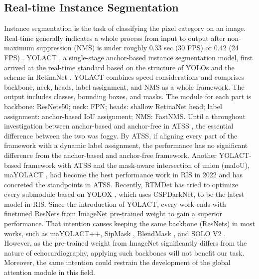 \documentclass{article}
\begin{document}
\subsection{Real-time Instance Segmentation}
\label{sec2.2}
Instance segmentation is the task of classifying the pixel category on an image. Real-time generally indicates a whole process from input to output after non-maximum suppression (NMS) is under roughly 0.33 sec (30 FPS) \cite{bolya2019yolact} or 0.42 (24 FPS) \cite{oksuz2021mask}. YOLACT \cite{bolya2019yolact}, a single-stage anchor-based instance segmentation model, first arrived at the real-time standard based on the structure of YOLOs \cite{redmon2018yolov3}\cite{ge2021yolox} and the scheme in RetinaNet \cite{lin2017focal}. YOLACT combines speed considerations and comprises backbone, neck, heads, label assignment, and NMS as a whole framework. The output includes classes, bounding boxes, and masks. The module for each part is backbone: ResNets50; neck: FPN; heads: shallow RetinaNet head; label assignment: anchor-based IoU assignment; NMS: FastNMS. Until a throughout investigation between anchor-based and anchor-free in ATSS \cite{zhang2020bridging}, the essential difference between the two was foggy. By ATSS, if aligning every part of the framework with a dynamic label assignment, the performance has no significant difference from the anchor-based and anchor-free framework. Another YOLACT-based framework with ATSS and the mask-aware intersection of union (maIoU), maYOLACT \cite{oksuz2021mask}, had become the best performance work in RIS in 2022 and has concreted the standpoints in ATSS. Recently, RTMDet \cite{lyu2022rtmdet} has tried to optimize every submodule based on YOLOX \cite{ge2021yolox}, which uses CSPDarkNet, to be the latest model in RIS. Since the introduction of YOLACT, every work ends with finetuned ResNets from ImageNet pre-trained weight to gain a superior performance. That intention causes keeping the same backbone (ResNets) in most works, such as {ma}YOLACT{++}, SipMask \cite{cao2020sipmask}, BlendMask \cite{chen2020blendmask}, and SOLO V2 \cite{wang2020solov2}. However, as the pre-trained weight from ImageNet significantly differs from the nature of echocardiography, applying such backbones will not benefit our task. Moreover, the same intention could restrain the development of the global attention module in this field. 
\end{document}
